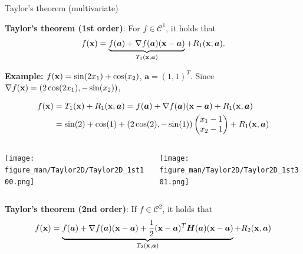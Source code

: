 \documentclass[11pt,compress,t,notes=noshow, xcolor=table]{beamer}
\begin{document}
\begin{vbframe}{Taylor's theorem (multivariate)}

\vspace{-\baselineskip}


\textbf{Taylor's theorem (1st order)}: For $f\in\mathcal{C}^1$, it holds that
\begin{equation*}
    f(\mathbf{x}) = \underbrace{f(\bm{a}) + \nabla f(\bm{a}) (\mathbf{x} - \bm{a})}_{T_1(\mathbf{x}, \bm{a})} + R_1(\mathbf{x},\bm{a}).
\end{equation*}


\begin{footnotesize}
    \textbf{Example: } $f(\mathbf{x}) = \sin(2x_1) + \cos(x_2)$, $\bm{a} = (1, 1)^T$.
    Since $\nabla f(\mathbf{x}) = \left(2\cos(2x_1), -\sin(x_2)\right)$,

    \vspace{-0.7\baselineskip}

    \begin{align*}
        f(\mathbf{x}) &= T_1(\mathbf{x}) + R_1(\mathbf{x}, \bm{a}) = f(\bm{a}) + \nabla f(\bm{a}) (\mathbf{x} - \bm{a}) + R_1(\mathbf{x}, \bm{a})\\
        &= \sin(2) + \cos(1) + (2 \cos(2), - \sin(1))\begin{pmatrix} x_1 - 1 \\ x_2 - 1\end{pmatrix} + R_1(\mathbf{x}, \bm{a})
    \end{align*}
\end{footnotesize}

\vspace*{-0.5\baselineskip}

\begin{columns}
    \begin{column}{0.4\textwidth}
        \texttt{[image: figure\_man/Taylor2D/Taylor2D\_1st100.png]}
    \end{column}
    \begin{column}{0.4\textwidth}
        \texttt{[image: figure\_man/Taylor2D/Taylor2D\_1st301.png]}
    \end{column}
\end{columns}

\framebreak

\vspace*{-1cm}


\textbf{Taylor's theorem (2nd order)}: If $f \in \mathcal{C}^2$, it holds that
\begin{equation*}
    f(\mathbf{x}) = \underbrace{f(\bm{a}) + \nabla f(\bm{a}) (\mathbf{x} - \bm{a}) + \frac{1}{2}(\mathbf{x} - \bm{a})^T\bm{H}(\bm{a})(\mathbf{x} - \bm{a})}_{T_2(\mathbf{x}, \bm{a})} + R_2(\mathbf{x},\bm{a})
\end{equation*}



\end{vbframe}
\end{document}
